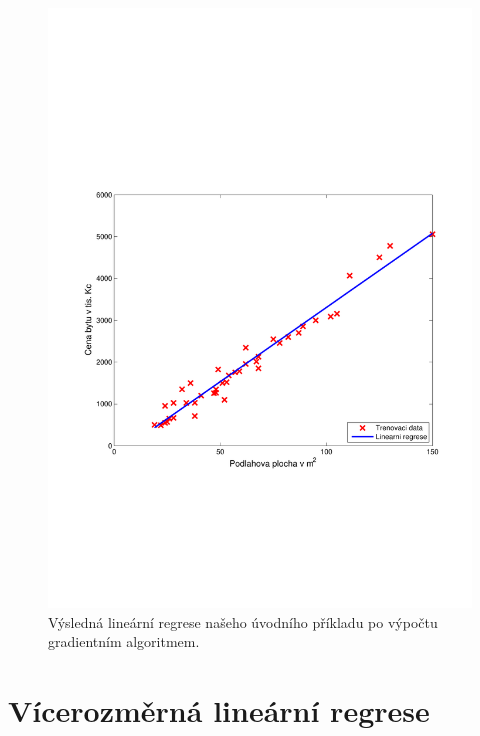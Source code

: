 \begin{figure}[!ht]
	\centering
	\includegraphics[scale = 0.5, trim = 2.5cm 7cm 2cm 9cm]{./Img/LinearniRegrese/cena_plocha_linear_regrese.pdf}
	\caption{Výsledná lineární regrese našeho úvodního příkladu po výpočtu gradientním algoritmem.}
	\label{fig:cena_plocha_linear_regrese}
\end{figure}


\newpage









\section{Vícerozměrná lineární regrese}
\label{sec:LinearniRegreseVicePromennych}

